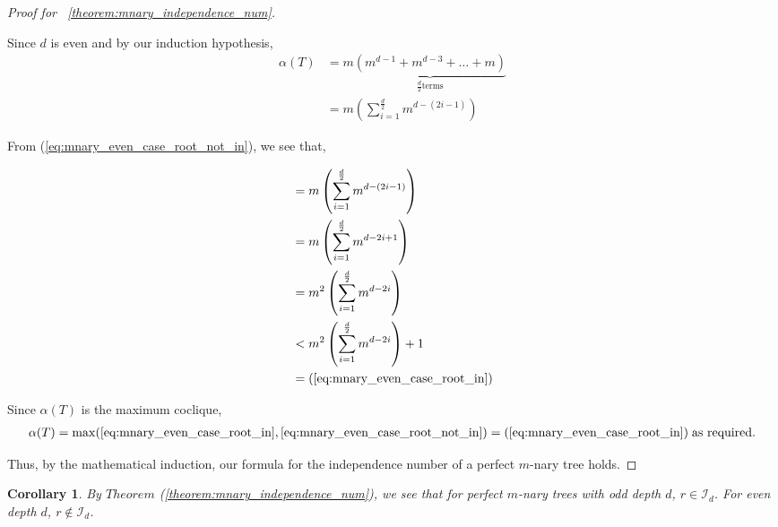 \documentclass{amsart}
\newtheorem{corollary}[theorem]{Corollary}
\theoremstyle{definition}
\begin{document}
\begin{proof}[Proof for ~\ref{theorem:mnary_independence_num}]
\begin{caseof}
\begin{subcaseof}
			Since $d$ is even and by our induction hypothesis,
			\begin{align}
				\alpha(T) & = m\underbrace{(m^{d - 1} + m^{d - 3} + \dots + m)}_{\frac{d}{2} \text{terms}}           \nonumber \\
				          & = m\left(\displaystyle\sum_{i = 1}^{\frac{d}{2}}m^{d - (2i - 1)}\right)
				\label{eq:mnary_even_case_root_not_in}
			\end{align}

			From (\ref{eq:mnary_even_case_root_not_in}), we see that,

			\begin{align*}
				 & = m\left(\displaystyle\sum_{i = 1}^{\frac{d}{2}}m^{d - (2i - 1)}\right) \\
				 & = m\left(\displaystyle\sum_{i = 1}^{\frac{d}{2}}m^{d - 2i + 1}\right)   \\
				 & = m^2\left(\displaystyle\sum_{i = 1}^{\frac{d}{2}}m^{d - 2i}\right)     \\
				 & < m^2\left(\displaystyle\sum_{i = 1}^{\frac{d}{2}}m^{d - 2i}\right) + 1 \\
				 & = (\ref{eq:mnary_even_case_root_in})
			\end{align*}

			Since $\alpha(T)$ is the maximum coclique,
			\begin{align*}
				\alpha(T) = \max(\ref{eq:mnary_even_case_root_in}, \ref{eq:mnary_even_case_root_not_in}) = (\ref{eq:mnary_even_case_root_in})\; \text{as required.}
			\end{align*}
		\end{subcaseof}
	\end{caseof}

	Thus, by the mathematical induction, our formula for the independence number of a perfect $m$-nary tree holds.
\end{proof}

\begin{corollary}\label{cor:root_in_not_in}
	By $Theorem$ (\ref{theorem:mnary_independence_num}), we see that for perfect $m$-nary trees with odd depth $d$, $r \in \mathcal{I}_d$. For even depth $d$, $r \not\in \mathcal{I}_d$.
\end{corollary}
\end{document}
